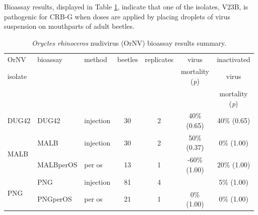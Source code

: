 \documentclass[12pt,
letterpaper,english,bibliography=totocnumbered, abstract=on]{scrartcl}
\begin{document}
Bioassay results, displayed in Table \ref{tab: bioassay results}, indicate that one of the isolates, V23B, is pathogenic for CRB-G when doses are applied by placing droplets of virus suspension on mouthparts of adult beetles.


\begin{table}[h]
	\begin{adjustbox}{width=\columnwidth,center}
		
		\begin{threeparttable} 
			\caption{\textit{Oryctes rhinoceros} nudivirus (OrNV) bioassay results summary.}
			\label{tab: bioassay results}
			
			
			\begin{tabular}{ l l l c c c c }
				\toprule
				OrNV                  & bioassay                                        & method\tnote{1} & beetles & replicates & virus                           & inactivated                     \\
				isolate               &                                                 &                 &         &            & mortality (\textit{p})\tnote{2} & virus                           \\
				&                                                 &                 &         &            &                                 & mortality (\textit{p})\tnote{3} \\ \bottomrule
				DUG42                 & DUG42 \parencite{moore_bioassay_2019}                 & injection       & 30      & 2          & 40\% (0.65)                     & 40\% (0.65)                     \\ \midrule
				\multirow{2}{*}{MALB} & MALB \parencite{moore_bioassay_2019-6}                & injection       & 30      & 2          & 50\% (0.37)                     & \hphantom{0}0\% (1.00)          \\
				& MALBperOS \parencite{moore_bioassay_2019-7}           & per os          & 13      & 1          & -60\% (1.00)                    & 20\% (1.00)                     \\ \midrule
				\multirow{2}{*}{PNG}  & PNG \parencite{moore_bioassay_2019-2}                 & injection       & 81      & 4          & \cellcolor{yellow}{90\% (0.00)} & \hphantom{0}5\% (1.00)          \\
				& PNGperOS \parencite{moore_bioassay_2019-9}            & per os          & 21      & 1          & \hphantom{0}0\% (1.00)          & \hphantom{0} 0\% (1.00)         \\ \midrule

\end{tabular}
\end{threeparttable}
\end{adjustbox}
\end{table}
\end{document}

